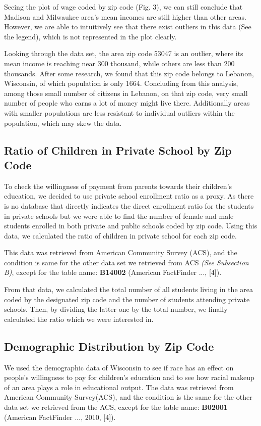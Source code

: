 \documentclass[letterpaper, 10 pt, conference]{ieeeconf}  %
\begin{document}
Seeing the plot of wage coded by zip code (Fig. 3), we can still conclude that Madison and Milwaukee area's mean incomes are still higher than other areas.
However, we are able to intuitively see that there exist outliers in this data (See the legend), which is not represented in the plot clearly.

Looking through the data set, the area zip code 53047 is an outlier, where its mean income is reaching near 300 thousand, while others are less than 200 thousands.
After some research, we found that this zip code belongs to Lebanon, Wisconsin, of which population is only 1664.
Concluding from this analysis, among those small number of citizens in Lebanon, on that zip code, very small number of people who earns a lot of money might live there. Additionally areas with smaller populations are less resistant to individual outliers within the population, which may skew the data.


\subsection{Ratio of Children in Private School by Zip Code}

To check the willingness of payment from parents towards their children's education, we decided to use private school enrollment ratio as a proxy.
As there is no database that directly indicates the direct enrollment ratio for the students in private schools but we were able to find the number of female and male students enrolled in both private and public schools coded by zip code. Using this data, we calculated the ratio of children in private school for each zip code.

This data was retrieved from American Community Survey (ACS), and the condition is same for the other data set we retrieved from ACS \textit{(See Subsection B)}, except for the table name: \textbf{B14002} (American FactFinder ..., [4]).

From that data, we calculated the total number of all students living in the area coded by the designated zip code and the number of students attending private schools.
Then, by dividing the latter one by the total number, we finally calculated the ratio which we were interested in.

\subsection{Demographic Distribution by Zip Code}

We used the demographic data of Wisconsin to see if race has an effect on people’s willingness to pay for children’s education and to see how racial makeup of an area plays a role in educational output. 
The data was retrieved from American Community Survey(ACS), and the condition is the same for the other data set we retrieved from the ACS, except for the table name: \textbf{B02001} (American FactFinder ..., 2010, [4]).
\end{document}

